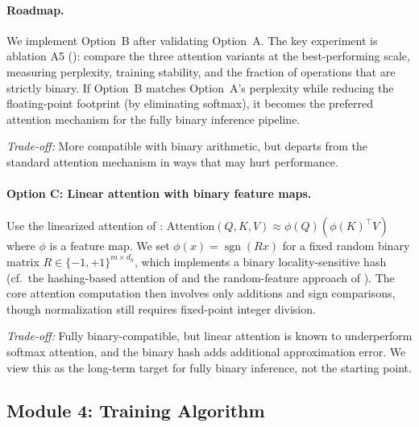 \documentclass[12pt,a4paper]{article}
\theoremstyle{plain}
\theoremstyle{definition}
\theoremstyle{remark}
\newcommand{\pmone}{\{-1,+1\}}
\newcommand{\sgn}{\operatorname{sgn}}
\begin{document}
\paragraph{Roadmap.}
We implement Option~B after validating Option~A. The key experiment is ablation A5 (): compare the three attention variants at the best-performing scale, measuring perplexity, training stability, and the fraction of operations that are strictly binary. If Option~B matches Option~A's perplexity while reducing the floating-point footprint (by eliminating softmax), it becomes the preferred attention mechanism for the fully binary inference pipeline.

\emph{Trade-off:} More compatible with binary arithmetic, but departs from the standard attention mechanism in ways that may hurt performance.

\paragraph{Option C: Linear attention with binary feature maps.}
Use the linearized attention of \citet{katharopoulos2020transformers}: $\text{Attention}(Q,K,V) \approx \phi(Q) (\phi(K)^\top V)$ where $\phi$ is a feature map. We set $\phi(x) = \sgn(R x)$ for a fixed random binary matrix $R \in \pmone^{m \times d_k}$, which implements a binary locality-sensitive hash (cf.\ the hashing-based attention of \citet{kitaev2020reformer} and the random-feature approach of \citet{choromanski2021rethinking}). The core attention computation then involves only additions and sign comparisons, though normalization still requires fixed-point integer division.

\emph{Trade-off:} Fully binary-compatible, but linear attention is known to underperform softmax attention, and the binary hash adds additional approximation error. We view this as the long-term target for fully binary inference, not the starting point.


\subsection{Module 4: Training Algorithm}\label{sec:training}
\end{document}
